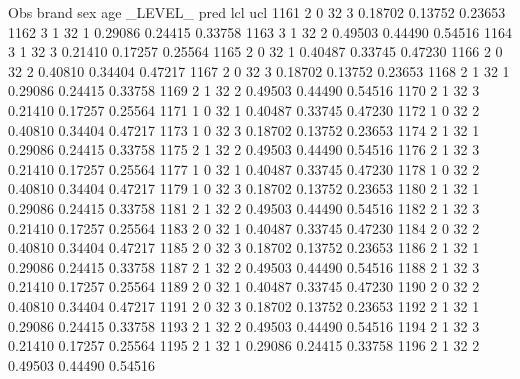 \documentclass{article}
\begin{document}
\begin{Woutput}
 Obs    brand    sex    age    _LEVEL_      pred       lcl        ucl
1161      2       0      32       3       0.18702    0.13752    0.23653
1162      3       1      32       1       0.29086    0.24415    0.33758
1163      3       1      32       2       0.49503    0.44490    0.54516
1164      3       1      32       3       0.21410    0.17257    0.25564
1165      2       0      32       1       0.40487    0.33745    0.47230
1166      2       0      32       2       0.40810    0.34404    0.47217
1167      2       0      32       3       0.18702    0.13752    0.23653
1168      2       1      32       1       0.29086    0.24415    0.33758
1169      2       1      32       2       0.49503    0.44490    0.54516
1170      2       1      32       3       0.21410    0.17257    0.25564
1171      1       0      32       1       0.40487    0.33745    0.47230
1172      1       0      32       2       0.40810    0.34404    0.47217
1173      1       0      32       3       0.18702    0.13752    0.23653
1174      2       1      32       1       0.29086    0.24415    0.33758
1175      2       1      32       2       0.49503    0.44490    0.54516
1176      2       1      32       3       0.21410    0.17257    0.25564
1177      1       0      32       1       0.40487    0.33745    0.47230
1178      1       0      32       2       0.40810    0.34404    0.47217
1179      1       0      32       3       0.18702    0.13752    0.23653
1180      2       1      32       1       0.29086    0.24415    0.33758
1181      2       1      32       2       0.49503    0.44490    0.54516
1182      2       1      32       3       0.21410    0.17257    0.25564
1183      2       0      32       1       0.40487    0.33745    0.47230
1184      2       0      32       2       0.40810    0.34404    0.47217
1185      2       0      32       3       0.18702    0.13752    0.23653
1186      2       1      32       1       0.29086    0.24415    0.33758
1187      2       1      32       2       0.49503    0.44490    0.54516
1188      2       1      32       3       0.21410    0.17257    0.25564
1189      2       0      32       1       0.40487    0.33745    0.47230
1190      2       0      32       2       0.40810    0.34404    0.47217
1191      2       0      32       3       0.18702    0.13752    0.23653
1192      2       1      32       1       0.29086    0.24415    0.33758
1193      2       1      32       2       0.49503    0.44490    0.54516
1194      2       1      32       3       0.21410    0.17257    0.25564
1195      2       1      32       1       0.29086    0.24415    0.33758
1196      2       1      32       2       0.49503    0.44490    0.54516

\end{Woutput}
\end{document}
